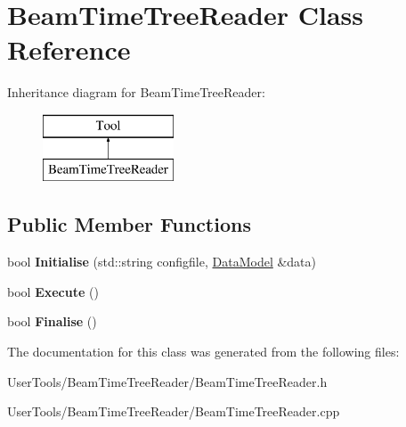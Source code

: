 \hypertarget{classBeamTimeTreeReader}{\section{Beam\-Time\-Tree\-Reader Class Reference}
\label{classBeamTimeTreeReader}
}
Inheritance diagram for Beam\-Time\-Tree\-Reader\-:\begin{figure}[H]
\begin{center}
\leavevmode
\includegraphics[height=2.000000cm]{classBeamTimeTreeReader}
\end{center}
\end{figure}
\subsection*{Public Member Functions}
\begin{DoxyCompactItemize}
\item 
\hypertarget{classBeamTimeTreeReader_a156a2386c5a9e9a6aab28a4fbf6df659}{bool {\bfseries Initialise} (std\-::string configfile, \hyperlink{classDataModel}{Data\-Model} \&data)}\label{classBeamTimeTreeReader_a156a2386c5a9e9a6aab28a4fbf6df659}

\item 
\hypertarget{classBeamTimeTreeReader_ae9094c6a47c9baa1a2394c50daa4fdb3}{bool {\bfseries Execute} ()}\label{classBeamTimeTreeReader_ae9094c6a47c9baa1a2394c50daa4fdb3}

\item 
\hypertarget{classBeamTimeTreeReader_ad6b505e7513ac9ab5b950cb15095ac79}{bool {\bfseries Finalise} ()}\label{classBeamTimeTreeReader_ad6b505e7513ac9ab5b950cb15095ac79}

\end{DoxyCompactItemize}


The documentation for this class was generated from the following files\-:\begin{DoxyCompactItemize}
\item 
User\-Tools/\-Beam\-Time\-Tree\-Reader/Beam\-Time\-Tree\-Reader.\-h\item 
User\-Tools/\-Beam\-Time\-Tree\-Reader/Beam\-Time\-Tree\-Reader.\-cpp\end{DoxyCompactItemize}
